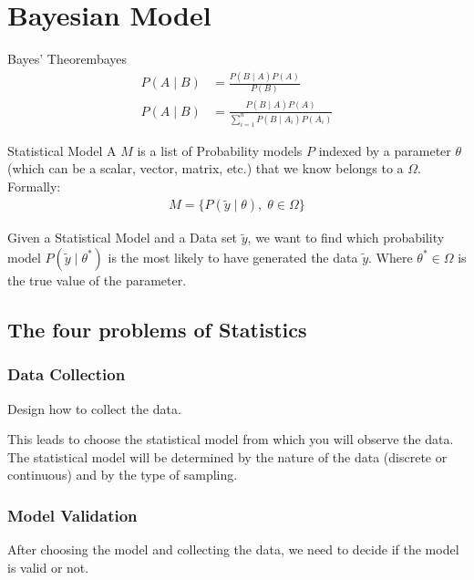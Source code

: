 
\section{Bayesian Model}

\begin{theorem}{Bayes' Theorem}{bayes}
	\begin{align}
		P(A \mid B) & = \frac{P(B \mid A)P(A)}{P(B)}                             \\
		P(A \mid B) & = \frac{P(B \mid A)P(A)}{\sum_{i=1}^n P(B \mid A_i)P(A_i)}
	\end{align}
\end{theorem}

\begin{definition}{Statistical Model}{}
	A  $M$ is a list of Probability models $P$ indexed by
	a parameter $\theta$ (which can be a scalar, vector, matrix, etc.) that
	we know belongs to a  $\Omega$.
	\\[1em]
	Formally:
	\begin{align}
		M = \{ P(\tilde{y}\mid\theta), \; \theta \in \Omega \}
	\end{align}
\end{definition}

Given a Statistical Model and a Data set $\tilde{y}$, we want to find
which probability model $P(\tilde{y}\mid\theta^*)$ is the most likely to
have generated the data $\tilde{y}$. Where $\theta^* \in \Omega$ is the true
value of the parameter.

\subsection{The four problems of Statistics}
\subsubsection{Data Collection}
Design how to collect the data.

This leads to choose the statistical model from which you will observe the data.
The statistical model will be determined by the nature of the data
(discrete or continuous) and by the type of sampling.

\subsubsection{Model Validation}

After choosing the model and collecting the data, we need to decide if
the model is valid or not.

